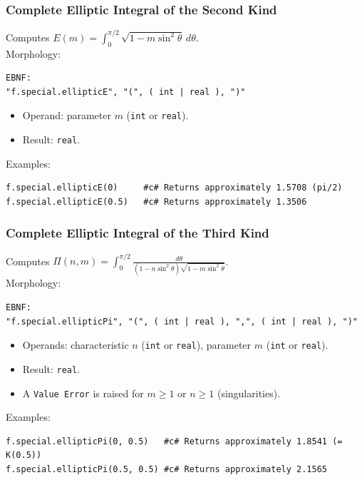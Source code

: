 \subsubsection{Complete Elliptic Integral of the Second Kind}
Computes $E(m) = \int_0^{\pi/2} \sqrt{1 - m \sin^2\theta}\,d\theta$. \\
Morphology:
\begin{verbatim}
EBNF:
"f.special.ellipticE", "(", ( int | real ), ")"
\end{verbatim}
\begin{itemize}
\item Operand: parameter $m$ (\texttt{int} or \texttt{real}).
\item Result: \texttt{real}.
\end{itemize}
Examples:
\begin{verbatim}
f.special.ellipticE(0)     #c# Returns approximately 1.5708 (pi/2)
f.special.ellipticE(0.5)   #c# Returns approximately 1.3506
\end{verbatim}

\subsubsection{Complete Elliptic Integral of the Third Kind}
Computes $\Pi(n, m) = \int_0^{\pi/2} \frac{d\theta}{(1 - n \sin^2\theta)\sqrt{1 - m \sin^2\theta}}$. \\
Morphology:
\begin{verbatim}
EBNF:
"f.special.ellipticPi", "(", ( int | real ), ",", ( int | real ), ")"
\end{verbatim}
\begin{itemize}
\item Operands: characteristic $n$ (\texttt{int} or \texttt{real}), parameter $m$ (\texttt{int} or \texttt{real}).
\item Result: \texttt{real}.
\item A \texttt{Value Error} is raised for $m \geq 1$ or $n \geq 1$ (singularities).
\end{itemize}
Examples:
\begin{verbatim}
f.special.ellipticPi(0, 0.5)   #c# Returns approximately 1.8541 (= K(0.5))
f.special.ellipticPi(0.5, 0.5) #c# Returns approximately 2.1565
\end{verbatim}

